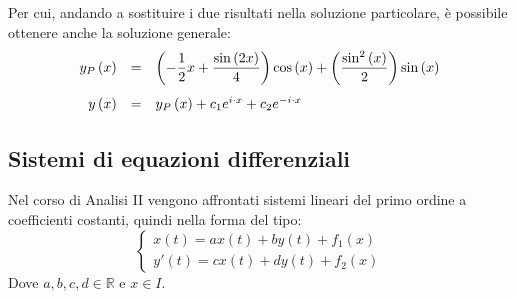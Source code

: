 \documentclass[a4paper]{article}
\begin{document}
	Per cui, andando a sostituire i due risultati nella soluzione particolare, è possibile ottenere anche la soluzione generale:
	\begin{equation*}
		\begin{array}[pos]{rcl}
			y_{P}\left(x\right) &=& \left(-\dfrac{1}{2}x + \dfrac{\sin\left(2x\right)}{4}\right)\cos\left(x\right) + \left(\dfrac{\sin^{2}\left(x\right)}{2}\right)\sin\left(x\right) \\ [1.4em]
			y\left(x\right) &=& y_{P}\left(x\right) + c_{1} e^{i \cdot x} + c_{2} e^{-i \cdot x}
		\end{array}
	\end{equation*}\newpage

	\subsection{Sistemi di equazioni differenziali}\label{subsection: sistemi di equazioni differenziali}

	Nel corso di Analisi II vengono affrontati sistemi lineari del primo ordine a coefficienti costanti, quindi nella forma del tipo:
	\begin{equation*}
		\begin{cases}
			x\left(t\right) = ax\left(t\right) + by\left(t\right) + f_{1}\left(x\right) \\
			y'\left(t\right) = cx\left(t\right) + dy\left(t\right) + f_{2}\left(x\right)
		\end{cases}
	\end{equation*}
	Dove $a,b,c,d \in \mathbb{R}$ e $x \in I$.\newline
\end{document}
